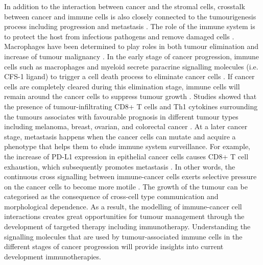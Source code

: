 In addition to the interaction between cancer and the stromal cells, crosstalk between cancer and immune cells is also closely connected to the tumourigenesis process including progression and metastasis \cite{wang2017role}. The role of the immune system is to protect the host from infectious pathogens and remove damaged cells \cite{davis2007molecular}. Macrophages have been determined to play roles in both tumour elimination and increase of tumour malignancy \cite{wyckoff2007direct, chung2005molecular}. In the early stage of cancer progression, immune cells such as macrophages and myeloid secrete paracrine signalling molecules (i.e. CFS-1 ligand)  to trigger a cell death process to eliminate cancer cells \cite{wyckoff2007direct}. If cancer cells are completely cleared during this elimination stage, immune cells will remain around the cancer cells to suppress tumour growth \cite{bronkhorst2011detection, ly2010aged}. Studies showed that the presence of tumour-infiltrating CD8+ T cells and Th1 cytokines surrounding the tumours associates with favourable prognosis in different tumour types including melanoma, breast, ovarian, and colorectal cancer \cite{fridman2012immune, shalapour2015immunity}. At a later cancer stage, metastasis happens when the cancer cells can mutate and acquire a phenotype that helps them to elude immune system surveillance. For example, the increase of PD-L1 expression in epithelial cancer cells causes CD8+ T cell exhaustion, which subsequently promotes metastasis \cite{chen2014metastasis, wei2019combination}. In other words, the continuous cross signalling between immune-cancer cells exerts selective pressure on the cancer cells to become more motile \cite{giampieri2009localized,ilina2009mechanisms}. The growth of the tumour can be categorised as the consequence of cross-cell type communication and morphological dependence. As a result, the modelling of immune-cancer cell interactions creates great opportunities for tumour management through the development of targeted therapy including immunotherapy. Understanding the signalling molecules that are used by tumour-associated immune cells in the different stages of cancer progression will provide insights into current development immunotherapies.  

